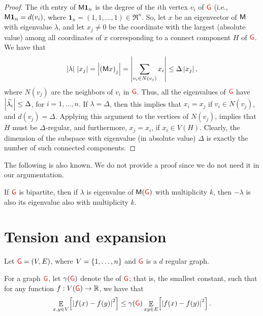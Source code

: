 \begin{proof}
    The $i$th entry of $\mathsf{M} \mathbf{1}_n$ is the degree of the $i$th
    vertex $v_i$ of ${\textcolor{red}{\mathsf{G}}}$ (i.e., $\mathsf{M} \mathbf{1}_n=d(v_i)$, where
    $\mathbf{1}_n =(1,1,\ldots, 1) \in \Re^n$.
    So, let $x$ be an eigenvector of $\mathsf{M}$ with eigenvalue
    $\lambda$, and let $x_j\ne 0$ be the coordinate with the largest
    (absolute value) among all coordinates of $x$ corresponding to a
    connect component $H$ of ${\textcolor{red}{\mathsf{G}}}$. We have that
    \[
    \cardin{\lambda} \, \cardin{x_j} 
    = \cardin{\pth{\Mtrx x}_j} = \cardin{\sum_{v_i \in N(v_j)} x_i}
    \leq \Delta \cardin{x_j}, 
    \]
    where $N(v_j)$ are the neighbors of $v_i$ in ${\textcolor{red}{\mathsf{G}}}$. Thus, all
    the eigenvalues of ${\textcolor{red}{\mathsf{G}}}$ have $\left| {\widehat{\lambda_{i}}} \right| \leq \Delta$,
    for $i=1,\ldots, n$. If $\lambda=\Delta$, then this implies that
    $x_i = x_j$ if $v_i \in N(v_j)$, and $d(v_j) = \Delta$. Applying
    this argument to the vertices of $N(v_j)$, implies that $H$ must
    be $\Delta$-regular, and furthermore, $x_j=x_i$, if $x_i \in
    V(H)$. Clearly, the dimension of the subspace with eigenvalue (in
    absolute value) $\Delta$ is exactly the number of such connected
    components.
\end{proof}

The following is also known. We do not provide a proof since we do not
need it in our argumentation.

\begin{lemma}
    If ${\textcolor{red}{\mathsf{G}}}$ is bipartite, then if $\lambda$ is eigenvalue of
    $\mathsf{M}({\textcolor{red}{\mathsf{G}}})$ with multiplicity $k$, then $-\lambda$ is also its
    eigenvalue also with multiplicity $k$.
\end{lemma}

\section{Tension and expansion}

Let ${\textcolor{red}{\mathsf{G}}}=(V,E)$, where $V = \left\{ {1,\ldots, n} \right\}$ and ${\textcolor{red}{\mathsf{G}}}$ is a
$d$ regular graph.



\begin{defn}
    For a graph ${\textcolor{red}{\mathsf{G}}}$, let $\DialX{\Graph}$ denote the
     of ${\textcolor{red}{\mathsf{G}}}$; that is, the smallest constant, such
    that for any function $f:V({\textcolor{red}{\mathsf{G}}}) \rightarrow \mathbb{R}$, we have that
    \begin{align}
        \ExExt{x,y \in V}{\cardin{f(x)- f(y)}^2} \leq
        \DialX{\Graph} \ExExt{ xy \in E}{\cardin{f(x)- f(y)}^2}.
        \eqlab{tension}
    \end{align}
\end{defn}

